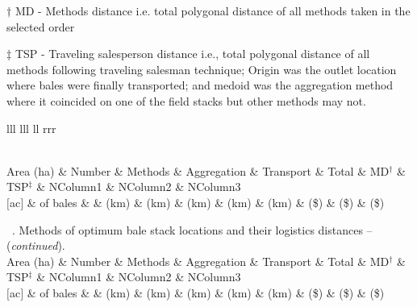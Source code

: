 \documentclass[phd]{ndsu-thesis-2022}
\newcommand\tabletopinfols{
\toprule
Area (ha) & Number  & Methods & Aggregation & Transport & Total & MD$^\dag$ & TSP$^\ddag$ & NColumn1  &  NColumn2  &  NColumn3 \\
$[$ac$]$ & of bales  &  & (km) & (km) & (km) & (km) & (km) & (\$) & (\$) & (\$) \\
    \midrule 
}
\begin{document}
\vspace{2ex}
\setlength\LTleft{0pt}
\setlength\LTright{0pt}

\begin{landscape}
\setlength\tabcolsep{5.2pt}
{\small 
{\renewcommand{\arraystretch}{0.6}
\begin{ThreePartTable}
  \begin{TableNotes}
  \baselineskip
    \item[] $\dag$ MD - Methods distance i.e. total polygonal distance of all methods taken in the selected order    
    \item[] $\ddag$ TSP - Traveling salesperson distance i.e., total polygonal distance of all methods following traveling salesman technique; Origin was the outlet location where bales were finally transported; and medoid was the aggregation method where it coincided on one of the field stacks but other methods may not.
  \end{TableNotes}
  \begin{longtable}{lll lll ll rrr}
  \caption{\normalsize A long table - spanning 3 pages - an example taken from our research group work on ``Methods of optimum bale stack locations and their logistics distances and methods combined distances.''}
  \label{tab16}\\[-2ex]     
  \tabletopinfols%
    \endfirsthead
    
{{\normalsize\tablename\ \thetable{}. Methods of optimum bale stack locations and their logistics distances  -- (\emph{continued}).}} \\[2ex]
 \tabletopinfols%
    \endhead
    
    \endfoot
    \bottomrule
    \insertTableNotes
    \endlastfoot
        

\end{longtable}
\end{ThreePartTable}}}
\end{landscape}
\end{document}
